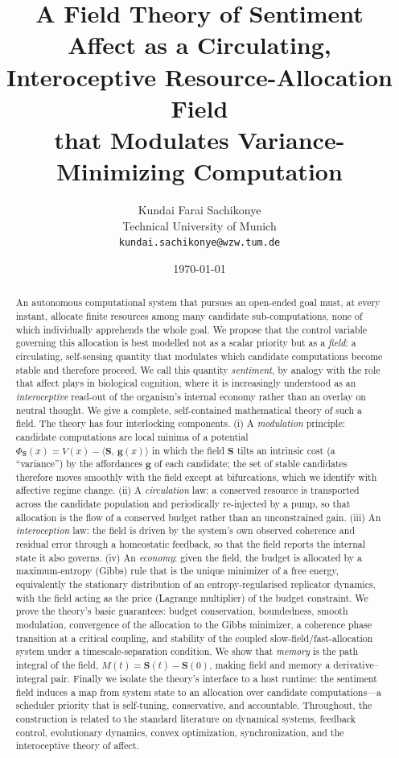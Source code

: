 \documentclass[11pt,a4paper]{article}
\title{\textbf{A Field Theory of Sentiment}\\[3pt]
\large Affect as a Circulating, Interoceptive Resource-Allocation Field\\
that Modulates Variance-Minimizing Computation}
\author{Kundai Farai Sachikonye\\[2pt]
\small Technical University of Munich\\
\small \texttt{kundai.sachikonye@wzw.tum.de}}
\date{\today}
\theoremstyle{plain}
\theoremstyle{definition}
\theoremstyle{remark}
\newcommand{\field}{\mathbf{S}}               %
\newcommand{\feat}{\mathbf{g}}                %
\newcommand{\Pot}{\Phi}                       %
\newcommand{\inner}[2]{\langle #1,\,#2\rangle}
\begin{document}
\maketitle

\begin{abstract}
\noindent
An autonomous computational system that pursues an open-ended goal must, at
every instant, allocate finite resources among many candidate sub-computations,
none of which individually apprehends the whole goal. We propose that the
control variable governing this allocation is best modelled not as a scalar
priority but as a \emph{field}: a circulating, self-sensing quantity that
modulates which candidate computations become stable and therefore proceed. We
call this quantity \emph{sentiment}, by analogy with the role that affect plays
in biological cognition, where it is increasingly understood as an
\emph{interoceptive} read-out of the organism's internal economy rather than an
overlay on neutral thought. We give a complete, self-contained mathematical
theory of such a field. The theory has four interlocking components. (i) A
\emph{modulation} principle: candidate computations are local minima of a
potential $\Pot_\field(x)=V(x)-\inner{\field}{\feat(x)}$ in which the field
$\field$ tilts an intrinsic cost (a ``variance'') by the affordances $\feat$ of
each candidate; the set of stable candidates therefore moves smoothly with the
field except at bifurcations, which we identify with affective regime change.
(ii) A \emph{circulation} law: a conserved resource is transported across the
candidate population and periodically re-injected by a pump, so that allocation
is the flow of a conserved budget rather than an unconstrained gain. (iii) An
\emph{interoception} law: the field is driven by the system's own observed
coherence and residual error through a homeostatic feedback, so that the field
reports the internal state it also governs. (iv) An \emph{economy}: given the
field, the budget is allocated by a maximum-entropy (Gibbs) rule that is the
unique minimizer of a free energy, equivalently the stationary distribution of
an entropy-regularised replicator dynamics, with the field acting as the price
(Lagrange multiplier) of the budget constraint. We prove the theory's basic
guarantees: budget conservation, boundedness, smooth modulation, convergence of
the allocation to the Gibbs minimizer, a coherence phase transition at a
critical coupling, and stability of the coupled slow-field/fast-allocation
system under a timescale-separation condition. We show that \emph{memory} is the
path integral of the field, $M(t)=\field(t)-\field(0)$, making field and memory
a derivative--integral pair. Finally we isolate the theory's interface to a
host runtime: the sentiment field induces a map from system state to an
allocation over candidate computations---a scheduler priority that is
self-tuning, conservative, and accountable. Throughout, the construction is
related to the standard literature on dynamical systems, feedback control,
evolutionary dynamics, convex optimization, synchronization, and the
interoceptive theory of affect.


\end{abstract}
\end{document}
